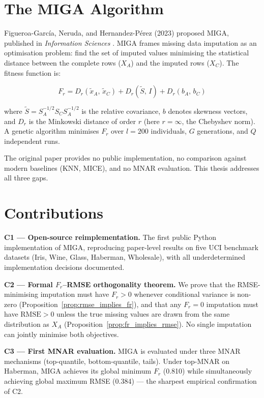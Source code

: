 \section{The MIGA Algorithm}

Figueroa-Garc\'ia, Neruda, and Hernandez-P\'erez (2023) proposed MIGA, published in \textit{Information Sciences} \cite{FigueroaGarcia2023}. MIGA frames missing data imputation as an optimisation problem: find the set of imputed values minimising the statistical distance between the complete rows ($X_A$) and the imputed rows ($X_C$). The fitness function is:

\begin{equation}
    F_r = D_r(\tilde{x}_A,\, \tilde{x}_C) + D_r(\tilde{S},\, I) + D_r(b_A,\, b_C)
    \label{eq:fr}
\end{equation}

where $\tilde{S} = S_A^{-1/2} S_C S_A^{-1/2}$ is the relative covariance, $b$ denotes skewness vectors, and $D_r$ is the Minkowski distance of order $r$ (here $r = \infty$, the Chebyshev norm). A genetic algorithm minimises $F_r$ over $l = 200$ individuals, $G$ generations, and $Q$ independent runs.

The original paper provides no public implementation, no comparison against modern baselines (KNN, MICE), and no MNAR evaluation. This thesis addresses all three gaps.

\section{Contributions}

\textbf{C1 --- Open-source reimplementation.} The first public Python implementation of MIGA, reproducing paper-level results on five UCI benchmark datasets (Iris, Wine, Glass, Haberman, Wholesale), with all underdetermined implementation decisions documented.

\textbf{C2 --- Formal $F_r$--RMSE orthogonality theorem.} We prove that the RMSE-minimising imputation must have $F_r > 0$ whenever conditional variance is non-zero (Proposition~\ref{prop:rmse_implies_fr}), and that any $F_r = 0$ imputation must have $\text{RMSE} > 0$ unless the true missing values are drawn from the same distribution as $X_A$ (Proposition~\ref{prop:fr_implies_rmse}). No single imputation can jointly minimise both objectives.

\textbf{C3 --- First MNAR evaluation.} MIGA is evaluated under three MNAR mechanisms (top-quantile, bottom-quantile, tails). Under top-MNAR on Haberman, MIGA achieves its global minimum $F_r$ (0.810) while simultaneously achieving global maximum RMSE (0.384) --- the sharpest empirical confirmation of C2.

